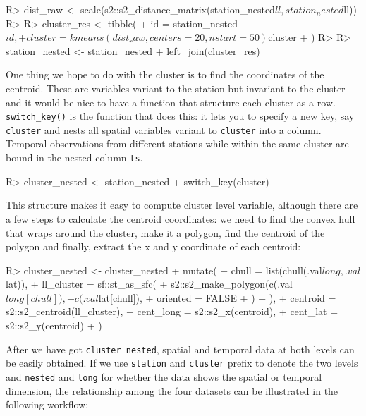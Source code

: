 \documentclass[
]{jss}
\begin{document}
\begin{CodeChunk}
\begin{CodeInput}
R> dist_raw <- scale(s2::s2_distance_matrix(station_nested$ll, station_nested$ll))
R> 
R> cluster_res <- tibble(
+   id = station_nested$id,
+   cluster = kmeans(dist_raw, centers = 20, nstart = 50)$cluster
+ )
R> 
R> station_nested <- station_nested %
+   left_join(cluster_res)
\end{CodeInput}
\end{CodeChunk}

One thing we hope to do with the cluster is to find the coordinates of
the centroid. These are variables variant to the station but invariant
to the cluster and it would be nice to have a function that structure
each cluster as a row. \texttt{switch\_key()} is the function that does
this: it lets you to specify a new key, say \texttt{cluster} and nests
all spatial variables variant to \texttt{cluster} into a column.
Temporal observations from different stations while within the same
cluster are bound in the nested column \texttt{ts}.

\begin{CodeChunk}
\begin{CodeInput}
R> cluster_nested <- station_nested %
+   switch_key(cluster)
\end{CodeInput}
\end{CodeChunk}

This structure makes it easy to compute cluster level variable, although
there are a few steps to calculate the centroid coordinates: we need to
find the convex hull that wraps around the cluster, make it a polygon,
find the centroid of the polygon and finally, extract the x and y
coordinate of each centroid:

\begin{CodeChunk}
\begin{CodeInput}
R> cluster_nested <- cluster_nested %
+   mutate(
+     chull = list(chull(.val$long, .val$lat)),
+     ll_cluster = sf::st_as_sfc(
+       s2::s2_make_polygon(c(.val$long[chull]),
+         c(.val$lat[chull]),
+         oriented = FALSE
+       )
+     ),
+     centroid = s2::s2_centroid(ll_cluster),
+     cent_long = s2::s2_x(centroid),
+     cent_lat = s2::s2_y(centroid)
+   )
\end{CodeInput}
\end{CodeChunk}

After we have got \texttt{cluster\_nested}, spatial and temporal data at
both levels can be easily obtained. If we use \texttt{station} and
\texttt{cluster} prefix to denote the two levels and \texttt{nested} and
\texttt{long} for whether the data shows the spatial or temporal
dimension, the relationship among the four datasets can be illustrated
in the following workflow:
\end{document}
